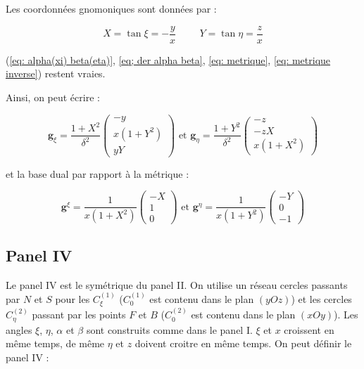Les coordonnées gnomoniques sont données par :

\begin{equation}
X = \tan \xi = - \dfrac{y}{x} \hspace{1cm} Y = \tan \eta = \dfrac{z}{x}
\end{equation}

(\ref{eq: alpha(xi) beta(eta)}, \ref{eq; der alpha beta}, \ref{eq: metrique}, \ref{eq: metrique inverse}) restent vraies. 

Ainsi, on peut écrire : 

\begin{equation}
\mathbf{g}_{\xi} = \dfrac{1+X^2}{\delta^2} \begin{pmatrix}
-y \\ x(1+Y^2) \\ yY
\end{pmatrix} \text{ et } \mathbf{g}_{\eta} = \dfrac{1+Y^2}{\delta^2} \begin{pmatrix}
-z \\ -zX \\ x(1+X^2)
\end{pmatrix}
\label{eq: base locale III}
\end{equation}

et la base dual par rapport à la métrique :

\begin{equation}
\mathbf{g}^{\xi} = \dfrac{1}{x(1+X^2)}\begin{pmatrix}
-X \\ 1 \\ 0
\end{pmatrix} \text{ et } \mathbf{g}^{\eta} = \dfrac{1}{x(1+Y^2)}\begin{pmatrix}
-Y \\ 0 \\ -1
\end{pmatrix}
\label{eq: base duale III}
\end{equation}
















\subsection{Panel IV}

Le panel IV est le symétrique du panel II. On utilise un réseau cercles passants par $N$ et $S$ pour les $C_{\xi}^{(1)}$ ($C_{0}^{(1)}$ est contenu dans le plan $(yOz)$) et les cercles $C_{\eta}^{(2)}$ passant par les points $F$ et $B$ ($C_{0}^{(2)}$ est contenu dans le plan $(xOy)$). Les angles $\xi$, $\eta$, $\alpha$ et $\beta$ sont construits comme dans le panel I. $\xi$ et $x$ croissent en même temps, de même $\eta$ et $z$ doivent croitre en même temps. On peut définir le panel IV :

